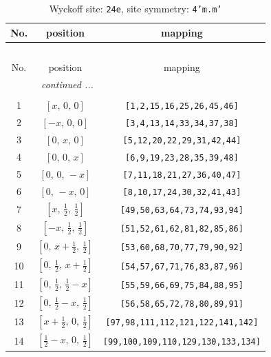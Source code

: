 \documentclass[fleqn,8pt]{jsarticle}
\begin{document}
\begin{longtable}{ccc}
\caption{Wyckoff site: {\tt 24e}, site symmetry: {\tt 4'm.m'}}
 \\
 \hline \hline
No. & position & mapping \\ \hline \endfirsthead

\multicolumn{2}{l}{\tablename\ \thetable{}} \\
 \hline \hline
No. & position & mapping \\ \hline \endhead

 \hline \hline
\multicolumn{2}{r}{\footnotesize\it continued ...} \\ \endfoot

 \hline \hline
\multicolumn{2}{r}{} \\ \endlastfoot

1 & $\left[ x,\, 0,\, 0 \right]$ & {\tt [1,2,15,16,25,26,45,46]} \\ \hline
2 & $\left[ - x,\, 0,\, 0 \right]$ & {\tt [3,4,13,14,33,34,37,38]} \\ \hline
3 & $\left[ 0,\, x,\, 0 \right]$ & {\tt [5,12,20,22,29,31,42,44]} \\ \hline
4 & $\left[ 0,\, 0,\, x \right]$ & {\tt [6,9,19,23,28,35,39,48]} \\ \hline
5 & $\left[ 0,\, 0,\, - x \right]$ & {\tt [7,11,18,21,27,36,40,47]} \\ \hline
6 & $\left[ 0,\, - x,\, 0 \right]$ & {\tt [8,10,17,24,30,32,41,43]} \\ \hline
7 & $\left[ x,\, \frac{1}{2},\, \frac{1}{2} \right]$ & {\tt [49,50,63,64,73,74,93,94]} \\ \hline
8 & $\left[ - x,\, \frac{1}{2},\, \frac{1}{2} \right]$ & {\tt [51,52,61,62,81,82,85,86]} \\ \hline
9 & $\left[ 0,\, x + \frac{1}{2},\, \frac{1}{2} \right]$ & {\tt [53,60,68,70,77,79,90,92]} \\ \hline
10 & $\left[ 0,\, \frac{1}{2},\, x + \frac{1}{2} \right]$ & {\tt [54,57,67,71,76,83,87,96]} \\ \hline
11 & $\left[ 0,\, \frac{1}{2},\, \frac{1}{2} - x \right]$ & {\tt [55,59,66,69,75,84,88,95]} \\ \hline
12 & $\left[ 0,\, \frac{1}{2} - x,\, \frac{1}{2} \right]$ & {\tt [56,58,65,72,78,80,89,91]} \\ \hline
13 & $\left[ x + \frac{1}{2},\, 0,\, \frac{1}{2} \right]$ & {\tt [97,98,111,112,121,122,141,142]} \\ \hline
14 & $\left[ \frac{1}{2} - x,\, 0,\, \frac{1}{2} \right]$ & {\tt [99,100,109,110,129,130,133,134]} \\ \hline

\end{longtable}
\end{document}
